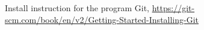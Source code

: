 \documentclass[10pt]{article}
\begin{document}
%
%
%

\begin{thebibliography}{100}
 Install instruction for the program Git, \url{https://git-scm.com/book/en/v2/Getting-Started-Installing-Git}
\end{thebibliography}
\end{document}
